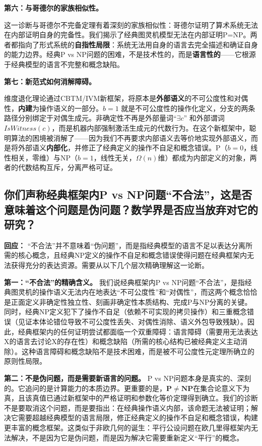 \documentclass{ctexart}
\begin{document}
	\textbf{第六：与哥德尔的家族相似性。}
	
	这一诊断与哥德尔不完备定理有着深刻的家族相似性：哥德尔证明了算术系统无法在内部证明自身的完备性。我们揭示了经典图灵机模型无法在内部证明P=NP。两者都指向了形式系统的\textbf{自指性局限}：系统无法用自身的语言去完全描述和确证自身的能力边界。经典P vs NP问题的困难，不是技术性的，而是\textbf{语言性的}——它根源于经典模型的语言不完整和概念缺陷。
	
	\textbf{第七：新范式如何消解障碍。}
	
	维度退化理论通过CBTM/IVM新框架，将原本是\textbf{外部语义}的不可公度性和对偶性，\textbf{内建}为操作语义的一部分。$b=1$ 就是不可公度性的操作化定义，分支的两条路径分别绑定于对偶生成元。非确定性不再是外部量词``$\exists c$'' 和外部谓词$IsWitness(c)$，而是机器内部强制激活生成元的代数行为。在这个新框架中，聪明算法的困境被消解了——因为我们不再要求内部语义去等价地实现外部语义，而是将外部语义\textbf{内部化}，并修正了经典定义的操作不自足和概念错误。P（$b=0$，线性相关，零维）与NP（$b=1$，线性无关，$\Omega(n)$维）都成为内部定义的对象，两者的代数结构互斥，分离严格可证。
	
	
	\subsection{你们声称经典框架内P vs NP问题``不合法''，这是否意味着这个问题是伪问题？数学界是否应当放弃对它的研究？}
	
	\textbf{回应：} ``不合法''并不意味着``伪问题''，而是指经典模型的语言不足以表达分离所需的核心概念，且经典NP定义的操作不自足和概念错误使得问题在经典框架内无法获得充分的表达资源。需要从以下几个层次精确理解这一论断。
	
	\textbf{第一：``不合法''的精确含义。} 我们说经典框架内P vs NP问题``不合法''，是指经典图灵机的操作语义无法内在地表达``不可公度性''和``对偶性''，而这两个概念恰恰是正面定义非确定性独立性、刻画非确定性本质结构、完成P与NP分离的关键。同时，经典NP定义犯下了操作不自足（依赖不可实现的拷贝操作）和三重概念错误（见证本体论错位导致不可公度性丢失、对偶性消除、语义外包导致残缺）。因此，经典框架内的任何证明尝试都面临一个双重障碍：语言障碍（需要用无法表达X的语言去讨论X的存在性）和概念缺陷（所需的核心结构已被经典定义主动消除）。这种语言障碍和概念缺陷不是技术困难，而是被不可公度性元定理所确立的原则性局限。
	
	\textbf{第二：不是伪问题，而是需要新语言的问题。} P vs NP问题本身是真实的、深刻的。它追问的是计算能力的本质边界。更重要的是，$\mathbf{P}\neq\mathbf{NP}$在集合论意义下为真，且该真值已通过新框架中的严格证明和参数化等价定理得到确立。我们的诊断不是要取消这个问题，而是要指出：在经典操作语义内部，该命题无法被证明；解决它需要超越经典模型的语言局限，修正经典定义的操作不自足和概念错误，构建更丰富的概念框架。这类似于非欧几何的诞生：平行公设问题在欧几里得框架内无法解决，不是因为它是伪问题，而是因为解决它需要重新定义``平行''的概念。
	
\end{document}
